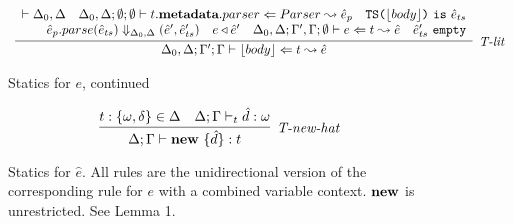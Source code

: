 \begin{figure}
\[\begin{array}{c}
\infer[\textit{T-lit}]
	  {\Delta_0, \Delta; \Gamma'; \Gamma \vdash \lfloor body \rfloor \Leftarrow t \leadsto \hat{e} }
	  {\renewcommand{\arraystretch}{1}
	    \begin{array}{r}
	    \vdash \Delta_0, \Delta ~~~ \Delta_0, \Delta ;\emptyset; \emptyset \vdash t.\keyw{metadata}.parser\Leftarrow Parser \leadsto \hat{e}_p ~~~ \texttt{TS(}\lfloor body \rfloor \texttt{)}\ \texttt{is}\ \hat{e}_{ts}\\
            \hat{e}_p.parse(\hat{e}_{ts}) \Downarrow_{\Delta_0, \Delta} (\hat{e}', \hat e_{ts}') ~~~  e \triangleleft  \hat{e}'~~~ \Delta_0, \Delta;\Gamma', \Gamma; \emptyset\vdash e\Leftarrow t \leadsto \hat{e} ~~~ \hat e_{ts}'\ \texttt{empty}
            \end{array}
       }
\end{array}
\]
\vspace{-10px}
\label{fig:statics2}
\caption{Statics for $e$, continued}
\vspace{-10px}
\end{figure}
\begin{figure}[t]
\centering
\[
\infer[\textit{T-new-hat}]
	{\Delta; \Gamma \vdash \keyw{new}\ \{ \hat d \} :  t }
	{ t:\{\omega, \delta\} \in \Delta & \Delta; \Gamma \vdash_t \hat d : \omega}
\]
\vspace{-15px}
\caption{Statics for $\hat e$. All rules are the unidirectional version of the corresponding rule for $e$ with a combined variable context. $\textbf{new}$ is unrestricted. See Lemma 1.}
\vspace{-10px}
\label{fig:staticsHat}
\end{figure}
